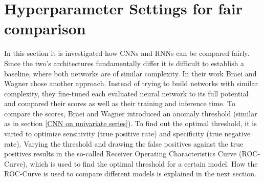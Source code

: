 %
%
%
%


\section{Hyperparameter Settings for fair comparison}
In this section it is investigated how CNNs and RNNs can be compared fairly. Since the two's architectures fundamentally differ it is difficult to establish a baseline, where both networks are of similar complexity. In their work Braei and Wagner \parencite*{Braei2020} chose another approach. Instead of trying to build networks with similar complexity, they fine-tuned each evaluated neural network to its full potential and compared their scores as well as their training and inference time. To compare the scores, Braei and Wagner introduced an anomaly threshold (similar as in section \ref{CNN on univariate series}). To find out the optimal threshold, it is varied to optimize sensitivity (true positive rate) and specificity (true negative rate). Varying the threshold and drawing the false positives against the true positives results in the so-called Receiver Operating Characteristics Curve (ROC-Curve), which is used to find the optimal threshold for a certain model. How the ROC-Curve is used to compare different models is explained in the next section.

